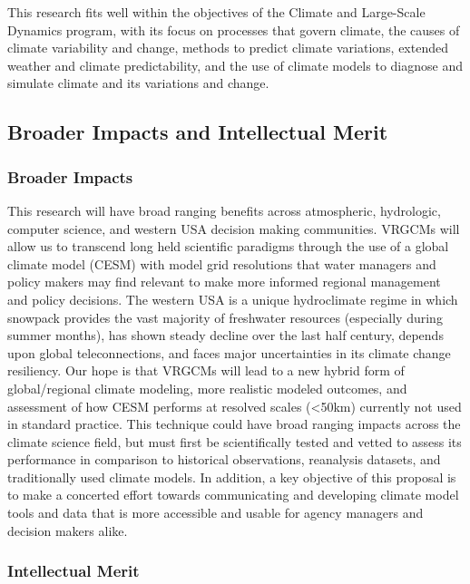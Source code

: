 \documentclass[11pt]{article}
\begin{document}
\noindent This research fits well within the objectives of the Climate and Large-Scale Dynamics program, with its focus on processes that govern climate, the causes of climate variability and change, methods to predict climate variations, extended weather and climate predictability, and the use of climate models to diagnose and simulate climate and its variations and change.

\subsection{Broader Impacts and Intellectual Merit}

\subsubsection{Broader Impacts}

This research will have broad ranging benefits across atmospheric, hydrologic, computer science, and western USA decision making communities.  VRGCMs will allow us to transcend long held scientific paradigms through the use of a global climate model (CESM) with model grid resolutions that water managers and policy makers may find relevant to make more informed regional management and policy decisions.  The western USA is a unique hydroclimate regime in which snowpack provides the vast majority of freshwater resources (especially during summer months), has shown steady decline over the last half century, depends upon global teleconnections, and faces major uncertainties in its climate change resiliency.  Our hope is that VRGCMs will lead to a new hybrid form of global/regional climate modeling, more realistic modeled outcomes, and assessment of how CESM performs at resolved scales (<50km) currently not used in standard practice.  This technique could have broad ranging impacts across the climate science field, but must first be scientifically tested and vetted to assess its performance in comparison to historical observations, reanalysis datasets, and traditionally used climate models.  In addition, a key objective of this proposal is to make a concerted effort towards communicating and developing climate model tools and data that is more accessible and usable for agency managers and decision makers alike.

\subsubsection{Intellectual Merit}
\end{document}
